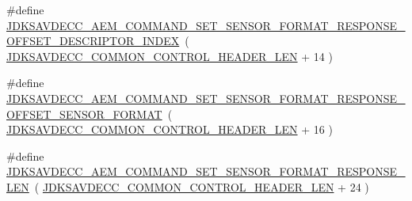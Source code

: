 \begin{DoxyCompactItemize}
\item 
\#define \hyperlink{group__command__set__sensor__format__response_ga3347921260949eb8cb16598c979b5ee0}{J\+D\+K\+S\+A\+V\+D\+E\+C\+C\+\_\+\+A\+E\+M\+\_\+\+C\+O\+M\+M\+A\+N\+D\+\_\+\+S\+E\+T\+\_\+\+S\+E\+N\+S\+O\+R\+\_\+\+F\+O\+R\+M\+A\+T\+\_\+\+R\+E\+S\+P\+O\+N\+S\+E\+\_\+\+O\+F\+F\+S\+E\+T\+\_\+\+D\+E\+S\+C\+R\+I\+P\+T\+O\+R\+\_\+\+I\+N\+D\+EX}~( \hyperlink{group__jdksavdecc__avtp__common__control__header_gaae84052886fb1bb42f3bc5f85b741dff}{J\+D\+K\+S\+A\+V\+D\+E\+C\+C\+\_\+\+C\+O\+M\+M\+O\+N\+\_\+\+C\+O\+N\+T\+R\+O\+L\+\_\+\+H\+E\+A\+D\+E\+R\+\_\+\+L\+EN} + 14 )
\item 
\#define \hyperlink{group__command__set__sensor__format__response_ga64533bd8abfb46db48e5eaf0bb131dbf}{J\+D\+K\+S\+A\+V\+D\+E\+C\+C\+\_\+\+A\+E\+M\+\_\+\+C\+O\+M\+M\+A\+N\+D\+\_\+\+S\+E\+T\+\_\+\+S\+E\+N\+S\+O\+R\+\_\+\+F\+O\+R\+M\+A\+T\+\_\+\+R\+E\+S\+P\+O\+N\+S\+E\+\_\+\+O\+F\+F\+S\+E\+T\+\_\+\+S\+E\+N\+S\+O\+R\+\_\+\+F\+O\+R\+M\+AT}~( \hyperlink{group__jdksavdecc__avtp__common__control__header_gaae84052886fb1bb42f3bc5f85b741dff}{J\+D\+K\+S\+A\+V\+D\+E\+C\+C\+\_\+\+C\+O\+M\+M\+O\+N\+\_\+\+C\+O\+N\+T\+R\+O\+L\+\_\+\+H\+E\+A\+D\+E\+R\+\_\+\+L\+EN} + 16 )
\item 
\#define \hyperlink{group__command__set__sensor__format__response_gac06f60a9d11cac2713f844b801db9902}{J\+D\+K\+S\+A\+V\+D\+E\+C\+C\+\_\+\+A\+E\+M\+\_\+\+C\+O\+M\+M\+A\+N\+D\+\_\+\+S\+E\+T\+\_\+\+S\+E\+N\+S\+O\+R\+\_\+\+F\+O\+R\+M\+A\+T\+\_\+\+R\+E\+S\+P\+O\+N\+S\+E\+\_\+\+L\+EN}~( \hyperlink{group__jdksavdecc__avtp__common__control__header_gaae84052886fb1bb42f3bc5f85b741dff}{J\+D\+K\+S\+A\+V\+D\+E\+C\+C\+\_\+\+C\+O\+M\+M\+O\+N\+\_\+\+C\+O\+N\+T\+R\+O\+L\+\_\+\+H\+E\+A\+D\+E\+R\+\_\+\+L\+EN} + 24 )
\end{DoxyCompactItemize}
